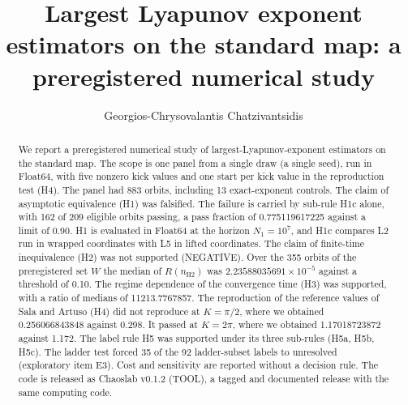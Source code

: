 \documentclass[aip,cha,reprint,amsmath,amssymb,longbibliography]{revtex4-2}
\newcommand{\sci}[2]{\ensuremath{#1\times10^{#2}}}
\newcommand{\tenp}[1]{\ensuremath{10^{#1}}}
\newcommand{\nH}{\ensuremath{n_{\mathrm{H2}}}}
\begin{document}
\title{Largest Lyapunov exponent estimators on the standard map: a preregistered numerical study}

\author{Georgios-Chrysovalantis Chatzivantsidis}

\begin{abstract}
We report a preregistered numerical study of largest-Lyapunov-exponent estimators on the standard map.
The scope is one panel from a single draw (a single seed), run in Float64, with five nonzero kick values and one start per kick value in the reproduction test (H4).
The panel had 883 orbits, including 13 exact-exponent controls.
The claim of asymptotic equivalence (H1) was falsified.
The failure is carried by sub-rule H1c alone, with 162 of 209 eligible orbits passing, a pass fraction of 0.775119617225 against a limit of 0.90.
H1 is evaluated in Float64 at the horizon $N_1=$\tenp{7}, and H1c compares L2 run in wrapped coordinates with L5 in lifted coordinates.
The claim of finite-time inequivalence (H2) was not supported (NEGATIVE).
Over the 355 orbits of the preregistered set $W$ the median of $R(\nH)$ was \sci{2.23588035691}{-5} against a threshold of 0.10.
The regime dependence of the convergence time (H3) was supported, with a ratio of medians of 11213.7767857.
The reproduction of the reference values of Sala and Artuso (H4) did not reproduce at $K=\pi/2$, where we obtained 0.256066843848 against 0.298.
It passed at $K=2\pi$, where we obtained 1.17018723872 against 1.172.
The label rule H5 was supported under its three sub-rules (H5a, H5b, H5c).
The ladder test forced 35 of the 92 ladder-subset labels to unresolved (exploratory item E3).
Cost and sensitivity are reported without a decision rule.
The code is released as Chaoslab v0.1.2 (TOOL), a tagged and documented release with the same computing code.
\end{abstract}

\maketitle
\end{document}
